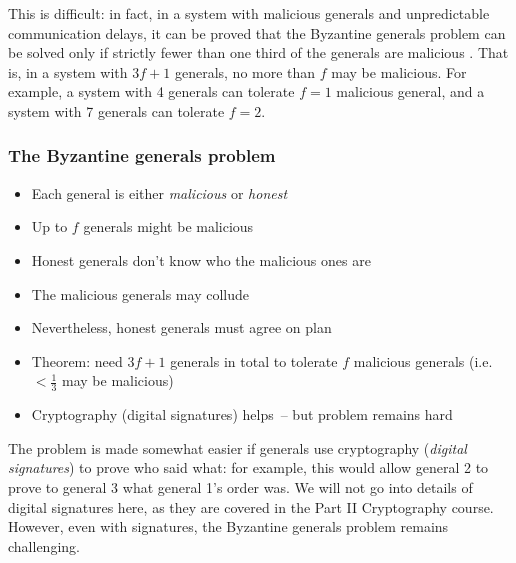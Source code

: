 This is difficult: in fact, in a system with malicious generals and unpredictable communication delays, it can be proved that the Byzantine generals problem can be solved only if strictly fewer than one third of the generals are malicious \citep[Theorem 4.4]{Dwork:1988dr}.
That is, in a system with $3f+1$ generals, no more than $f$ may be malicious.
For example, a system with 4 generals can tolerate $f=1$ malicious general, and a system with 7 generals can tolerate $f=2$.

\begin{frame}
    \label{s:byzantine-discussion}
    \frametitle{The Byzantine generals problem}
    \begin{itemize}
        \item Each general is either \emph{malicious} or \emph{honest}\\[0.5em]
        \item Up to $f$ generals might be malicious\\[0.5em]
        \item Honest generals don't know who the malicious ones are\\[0.5em]
        \item The malicious generals may collude\\[0.5em]
        \item Nevertheless, honest generals must agree on plan\\[2em]\pause
        \item Theorem: need $3f+1$ generals in total to tolerate $f$ malicious generals (i.e.\ $< \frac{1}{3}$ may be malicious)\\[0.5em]
        \item Cryptography (digital signatures) helps~-- but problem remains hard\\[0.5em]
    \end{itemize}
\end{frame}

The problem is made somewhat easier if generals use cryptography (\emph{digital signatures}) to prove who said what: for example, this would allow general 2 to prove to general 3 what general 1's order was.
We will not go into details of digital signatures here, as they are covered in the Part II Cryptography course.
However, even with signatures, the Byzantine generals problem remains challenging.

